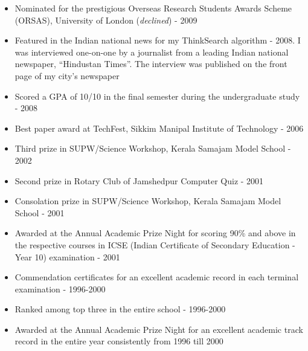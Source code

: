 \documentclass[margin]{res}
\begin{document}
\begin{resume}
\begin{itemize}
\item Nominated for the prestigious Overseas Research Students Awards Scheme (ORSAS), University of London (\textit{declined}) - 2009\\

\item Featured in the Indian national news for my ThinkSearch algorithm - 2008. I was interviewed one-on-one by a journalist from a leading Indian national newspaper, ``Hindustan Times''. The interview was published on the front page of my city's newspaper\\

\item Scored a GPA of 10/10 in the final semester during the undergraduate study - 2008\\

\item Best paper award at TechFest, Sikkim Manipal Institute of Technology - 2006\\

\item Third prize in SUPW/Science Workshop, Kerala Samajam Model School - 2002\\

\item Second prize in Rotary Club of Jamshedpur Computer Quiz - 2001\\

\item Consolation prize in SUPW/Science Workshop, Kerala Samajam Model School - 2001\\

\item Awarded at the Annual Academic Prize Night for scoring 90\% and above in the respective courses in ICSE (Indian Certificate of Secondary Education - Year 10) examination - 2001\\

\item Commendation certificates for an excellent academic record in each terminal examination - 1996-2000\\

\item Ranked among top three in the entire school - 1996-2000\\

\item Awarded at the Annual Academic Prize Night for an excellent academic track record in the entire year consistently from 1996 till 2000\\


\end{itemize}
\end{resume}
\end{document}
